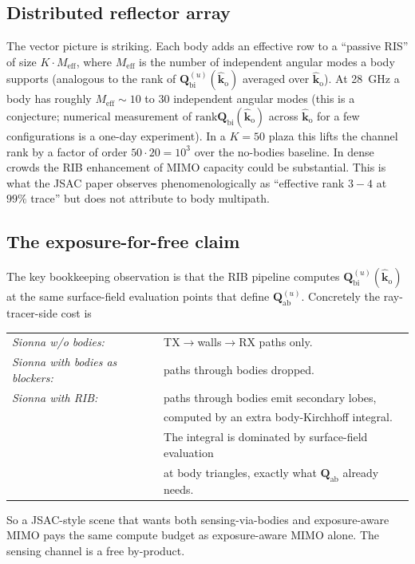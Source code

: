 \documentclass[11pt,a4paper]{article}
\theoremstyle{definition}
\newcommand{\Qabs}{\mathbf{Q}_{\mathrm{ab}}}
\newcommand{\kout}{\hat{\bm{k}}_{\mathrm{o}}}
\newcommand{\Qbist}{\mathbf{Q}_{\mathrm{bi}}}
\begin{document}
\subsection{Distributed reflector array}

The vector picture is striking.  Each body adds an effective row to a
``passive RIS'' of size $K\cdot M_{\mathrm{eff}}$, where
$M_{\mathrm{eff}}$ is the number of independent angular modes a body
supports (analogous to the rank of $\Qbist^{(u)}(\kout)$ averaged
over $\kout$).  At \SI{28}{GHz} a body has roughly
$M_{\mathrm{eff}}\sim 10$ to $30$ independent angular modes (this is
a conjecture; numerical measurement of $\mathrm{rank}\Qbist(\kout)$
across $\kout$ for a few configurations is a one-day experiment).  In
a $K=50$ plaza this lifts the channel rank by a factor of order
$50\cdot 20=10^3$ over the no-bodies baseline.  In dense crowds the
RIB enhancement of MIMO capacity could be substantial.  This is what
the JSAC paper observes phenomenologically as ``effective rank
$3{-}4$ at $99\%$ trace'' but does not attribute to body multipath.

\subsection{The exposure-for-free claim}

The key bookkeeping observation is that the RIB pipeline computes
$\Qbist^{(u)}(\kout)$ at the same surface-field evaluation points
that define $\Qabs^{(u)}$.  Concretely the ray-tracer-side cost is

\begin{tabular}{ll}
\textit{Sionna w/o bodies:} & TX$\to$walls$\to$RX paths only.\\
\textit{Sionna with bodies as blockers:} & paths through bodies dropped.\\
\textit{Sionna with RIB:} & paths through bodies emit secondary lobes,\\
& computed by an extra body-Kirchhoff integral.\\
& The integral is dominated by surface-field evaluation\\
& at body triangles, exactly what $\Qabs$ already needs.
\end{tabular}

So a JSAC-style scene that wants both sensing-via-bodies and
exposure-aware MIMO pays the same compute budget as exposure-aware
MIMO alone.  The sensing channel is a free by-product.

\end{document}
